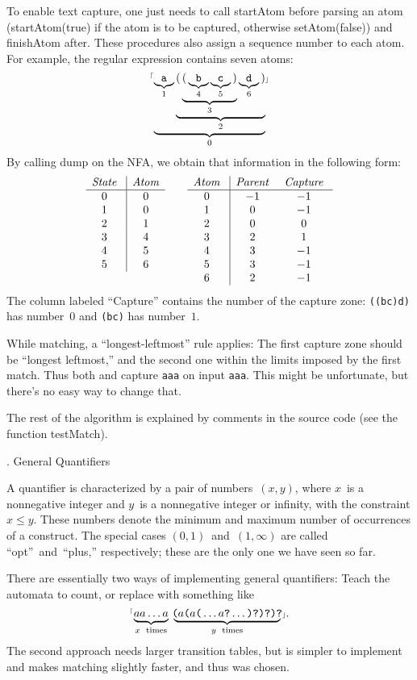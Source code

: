 To enable text capture, one just needs to call {\sf startAtom} before parsing an atom ({\sf startAtom(true)} if the atom is to be captured, otherwise {\sf setAtom(false)}) and {\sf finishAtom} after.  These procedures also assign a sequence number to each atom.  For example, the regular expression  contains seven atoms:  $$\hbox{{$^{\scriptscriptstyle\lceil}$\tt$\underbrace{\underbrace{\tt a}_1\underbrace{{\tt (}\underbrace{{\tt (}\underbrace{\tt b}_4\underbrace{\tt c}_5{\tt )}}_3\underbrace{\tt d}_6{\tt )}}_2}_0$$\scriptscriptstyle\rfloor$}}$$  By calling {\sf dump} on the NFA, we obtain that information in the following form: $$\vtop{\halign{\g{$#$} \vrule & \g{$#$}\cr
  {\it State\/} & {\it Atom\/} \cr
\noalign{\hrule}
  0             & 0 \cr
  1             & 0 \cr
  2             & 1 \cr
  3             & 4 \cr
  4             & 5 \cr
  5             & 6 \cr
}}\qquad\vtop{\halign{\g{$#$} \vrule && \g{$#$} \cr
  {\it Atom\/} & {\it Parent\/} & {\it Capture\/} \cr
\noalign{\hrule}
  0            &  -1            & -1 \cr
  1            &  0             & -1 \cr
  2            &  0             &  0 \cr
  3            &  2             &  1 \cr
  4            &  3             & -1 \cr
  5            &  3             & -1 \cr
  6            &  2             & -1 \cr
}}$$  The column labeled ``Capture'' contains the number of the capture zone:  {\tt ((bc)d)} has number~$0$ and {\tt (bc)} has number~$1$.

While matching, a ``longest-leftmost'' rule applies:  The first capture zone should be ``longest leftmost,'' and the second one within the limits imposed by the first match.  Thus both  and  capture {\tt aaa} on input {\tt aaa}.  This might be unfortunate, but there's no easy way to change that.

The rest of the algorithm is explained by comments in the source code (see the function {\sf testMatch}).

. General Quantifiers

A quantifier is characterized by a pair of numbers~$(x, y)$, where $x$~is a nonnegative integer and $y$~is a nonnegative integer or infinity, with the constraint $x \le y$.  These numbers denote the minimum and maximum number of occurrences of a construct.  The special cases $(0, 1)$~and~$(1, \infty)$ are called ``opt''~and~``plus,'' respectively; these are the only one we have seen so far.

There are essentially two ways of implementing general quantifiers:  Teach the automata to count, or replace  with something like $$\hbox{\rx{$\underbrace{\hbox{$aa$}\ldots\hbox{$a$\vphantom)}}_{x\rm\ times}\,\,\underbrace{\!\hbox{($a$($a$(}\ldots\hbox{$a$?}\ldots\hbox{)?)?)?}\!}_{y\rm\ times}\,$}.}$$  The second approach needs larger transition tables, but is simpler to implement and makes matching slightly faster, and thus was chosen.

